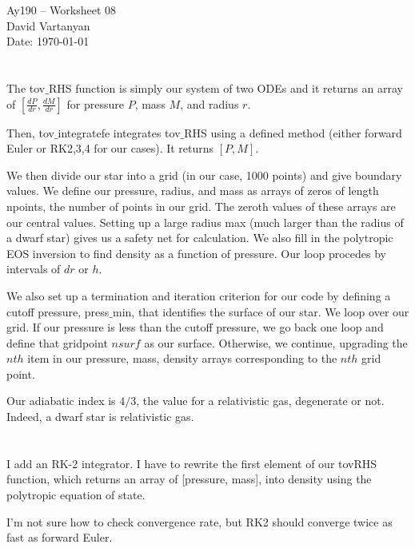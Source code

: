 \documentclass[11pt,letterpaper]{article}
\begin{document}
\begin{center}
\Large
Ay190 -- Worksheet 08\\
David Vartanyan\\
Date: \today
\end{center}

\section{}

The tov$\_$RHS function is simply our system of two ODEs and it returns an array of $[\frac{dP}{dr}, \frac{dM}{dr}]$ for pressure $P$, mass $M$, and radius $r$.

Then, tov$\_$integratefe integrates tov$\_$RHS using a defined method (either forward Euler or RK2,3,4 for our cases). It returns $[P,M]$.

We then divide our star into a grid (in our case, 1000 points) and give boundary values. We define our pressure, radius, and mass as arrays of zeros of length npoints, the number of points in our grid. The zeroth values of these arrays are our central values. Setting up a large radius max (much larger than the radius of a dwarf star) gives us a safety net for calculation. We also fill in the polytropic EOS inversion to find density as a function of pressure. Our loop procedes by intervals of $dr$ or $h$.

We also set up a termination and iteration criterion for our code by defining a cutoff pressure, press$\_$min, that identifies the surface of our star. We loop over our grid. If our pressure is less than the cutoff pressure, we go back one loop and define that gridpoint $nsurf$ as our surface. Otherwise, we continue, upgrading the $nth$ item in our pressure, mass, density arrays corresponding to the $nth$ grid point.

Our adiabatic index is $4/3$, the value for a relativistic gas, degenerate or not. Indeed, a dwarf star is relativistic gas.

\section{}

I add an RK-2 integrator. I have to rewrite the first element of our tovRHS function, which returns an array of [pressure, mass], into density using the polytropic equation of state.

I'm not sure how to check convergence rate, but RK2 should converge twice as fast as forward Euler.
\end{document}
